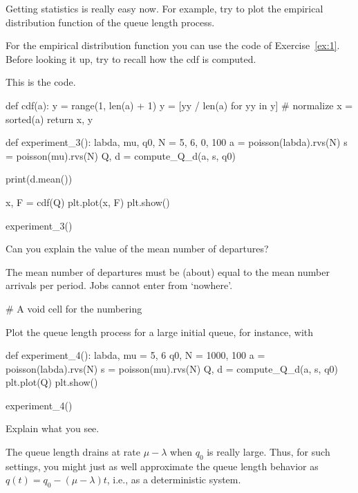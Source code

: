 \begin{exercise}
  Getting statistics is really easy now.
  For example, try to plot the empirical distribution function of the queue length process.
\begin{hint}
For  the empirical distribution function  you can use the code of Exercise~\ref{ex:1}. Before looking it up, try to recall how the cdf is computed.
\end{hint}


\begin{solution}
This is the code.
  \begin{pyverbatim}
def cdf(a):
    y = range(1, len(a) + 1)
    y = [yy / len(a) for yy in y]  # normalize
    x = sorted(a)
    return x, y


def experiment_3():
    labda, mu, q0, N = 5, 6, 0, 100
    a = poisson(labda).rvs(N)
    s = poisson(mu).rvs(N)
    Q, d = compute_Q_d(a, s, q0)

    print(d.mean())

    x, F = cdf(Q)
    plt.plot(x, F)
    plt.show()


experiment_3()
  \end{pyverbatim}
  \end{solution}
\end{exercise}

\begin{exercise}
  Can you explain the value of the mean number of departures?
\begin{solution}
  The mean number of departures must be (about) equal to the mean number arrivals per period.
  Jobs cannot enter from `nowhere'.

  \begin{pyverbatim}
# A void cell for the numbering    
  \end{pyverbatim}
  \end{solution}
\end{exercise}


\begin{exercise}
Plot the queue length process for a large initial queue, for instance, with

\begin{pyverbatim}
def experiment_4():
    labda, mu = 5, 6
    q0, N = 1000, 100
    a = poisson(labda).rvs(N)
    s = poisson(mu).rvs(N)
    Q, d = compute_Q_d(a, s, q0)
    plt.plot(Q)
    plt.show()


experiment_4()
\end{pyverbatim}
Explain what you see.
\begin{solution}
  The queue length drains at rate $\mu-\lambda$ when $q_0$ is really large.
  Thus, for such settings, you might just as well approximate the queue length behavior as $q(t) = q_0 - (\mu-\lambda)t$, i.e., as a deterministic system.
\end{solution}
\end{exercise}



